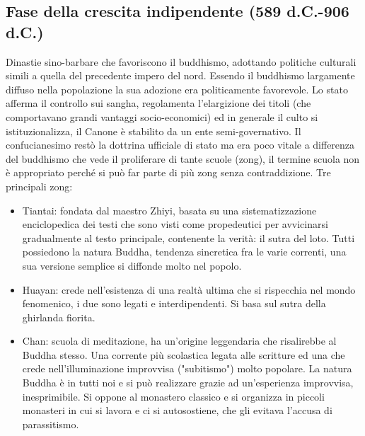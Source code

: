 \documentclass[10pt,a4paper]{report}
\begin{document}
\subsection{Fase della crescita indipendente (589 d.C.-906 d.C.)}
Dinastie sino-barbare che favoriscono il buddhismo, adottando politiche culturali simili a quella del precedente impero del nord. Essendo il buddhismo largamente diffuso nella popolazione la sua adozione era politicamente favorevole. Lo stato afferma il controllo sui sangha, regolamenta l'elargizione dei titoli (che comportavano grandi vantaggi socio-economici) ed in generale il culto si istituzionalizza, il Canone è stabilito da un ente semi-governativo. Il confucianesimo restò la dottrina ufficiale di stato ma era poco vitale a differenza del buddhismo che vede il proliferare di tante scuole (zong), il termine scuola non è appropriato perché si può far parte di più zong senza contraddizione. Tre principali zong:
\begin{itemize}
	\item Tiantai: fondata dal maestro Zhiyi, basata su una sistematizzazione enciclopedica dei testi che sono visti come propedeutici per avvicinarsi gradualmente al testo principale, contenente la verità: il sutra del loto. Tutti possiedono la natura Buddha, tendenza sincretica fra le varie correnti, una sua versione semplice si diffonde molto nel popolo.
	\item Huayan: crede nell'esistenza di una realtà ultima che si rispecchia nel mondo fenomenico, i due sono legati e interdipendenti. Si basa sul sutra della ghirlanda fiorita.
	\item Chan: scuola di meditazione, ha un'origine leggendaria che risalirebbe al Buddha stesso. Una corrente più scolastica legata alle scritture ed una che crede nell'illuminazione improvvisa ("subitismo") molto popolare. La natura Buddha è in tutti noi e si può realizzare grazie ad un'esperienza improvvisa, inesprimibile. Si oppone al monastero classico e si organizza in piccoli monasteri in cui si lavora e ci si autosostiene, che gli evitava l'accusa di parassitismo. 
\end{itemize}
\newpage
\appendix
\end{document}
